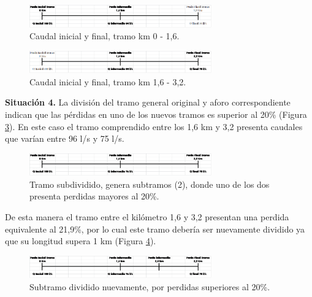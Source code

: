 \documentclass[]{article}
\begin{document}
\begin{figure}[h]
\centering
\includegraphics[width=0.7\textwidth]{images/sit_3_1.eps}
\caption{Caudal inicial y final, tramo km 0 - 1,6.}
\label{sit_3_1}
\end{figure}

\begin{figure}[h]
\centering
\includegraphics[width=0.7\textwidth]{images/sit_3_2.eps}
\caption{Caudal inicial y final, tramo km 1,6 - 3,2.}
\label{sit_3_2}
\end{figure}

\textbf{Situación 4.} La división del tramo general original y aforo correspondiente indican que las pérdidas en uno de los nuevos tramos es superior al 20\% (Figura \ref{sit_4}). En este caso el tramo comprendido entre los 1,6 km y 3,2 presenta caudales que varían entre 96 l/s y 75 l/s.\\

\begin{figure}[h]
\centering
\includegraphics[width=0.7\textwidth]{images/sit_4.eps}
\caption{Tramo subdividido, genera subtramos (2), donde uno de los dos presenta perdidas mayores al 20\%.}
\label{sit_4}
\end{figure}

De esta manera el tramo entre el kilómetro 1,6 y 3,2 presentan una perdida equivalente al 21,9\%, por lo cual este tramo debería ser nuevamente dividido ya que su longitud supera 1 km (Figura \ref{sit_4_1}).\\

\begin{figure}[h]
\centering
\includegraphics[width=0.7\textwidth]{images/sit_4_1.eps}
\caption{Subtramo dividido nuevamente, por perdidas superiores al 20\%.}
\label{sit_4_1}
\end{figure}
\end{document}
